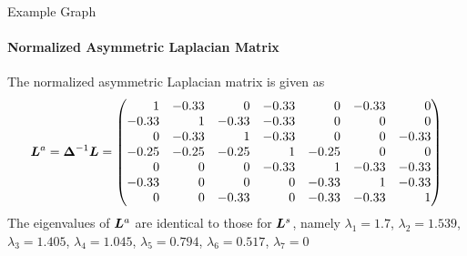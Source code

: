 \begin{frame}{Example Graph}
\framesubtitle{Normalized Asymmetric Laplacian Matrix}
\begin{figure}
    \centerline{
	}
		\vspace{-0.2in}
 \end{figure}
\small
    The normalized asymmetric Laplacian matrix is given as
    \begin{align*}
        \bL^a = \bDelta^{-1}\bL =
        \amatr{r}{
         1   & -0.33&  0   & -0.33&  0   & -0.33&  0\\
        -0.33&  1   & -0.33& -0.33&  0   &  0   &  0\\
         0   & -0.33&  1   & -0.33&  0   &  0   & -0.33\\
        -0.25& -0.25& -0.25&  1   & -0.25&  0   &  0\\
         0   &  0   &  0   & -0.33&  1   & -0.33& -0.33\\
        -0.33&  0   &  0   &  0   & -0.33&  1   & -0.33\\
         0   &  0   & -0.33&  0   & -0.33& -0.33&  1}
    \end{align*}
    The eigenvalues of ${\boldsymbol L}^a$ are identical to those for ${\boldsymbol L}^s$,
    namely
    $\lambda_1 = 1.7$,
    $\lambda_2 =1.539$,
    $\lambda_3 = 1.405$,
    $\lambda_4 =1.045$,
    $\lambda_5 =0.794$,
    $\lambda_6 =0.517$,
    $\lambda_7 = 0 $
  \end{frame}


